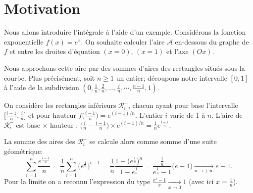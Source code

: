 \documentclass[class=report,crop=false]{standalone}
\begin{document}








\section*{Motivation}


Nous allons introduire l'intégrale à l'aide d'un exemple.
Considérons la fonction exponentielle $f(x)=e^x$. On souhaite calculer
l'aire $\mathcal{A}$ en-dessous du graphe de $f$ et entre les droites d'équation $(x=0)$, $(x=1)$ et l'axe $(O x)$.


Nous approchons cette aire par des sommes d'aires des rectangles situés sous la courbe.
Plus précisément, soit $n \ge 1$ un entier; découpons notre intervalle $[0,1]$
à l'aide de la subdivision $(0,\frac{1}{n},\frac{2}{n}, \ldots, \frac{i}{n}, \cdots,\frac{n-1}{n},1)$.

On considère les \og rectangles inférieurs \fg{} $\mathcal{R}_i^-$,
chacun ayant pour base l'intervalle $\big[\frac{i-1}{n},\frac{i}{n}\big]$
et pour hauteur $f\big(\frac{i-1}{n}\big)=e^{(i-1)/n}$. L'entier $i$ varie de $1$ à $n$.
L'aire de $\mathcal{R}_i^-$ est \og base $\times$ hauteur \fg{} : $\big(\frac{i}{n}-\frac{i-1}{n}\big) \times e^{(i-1)/n}
= \frac{1}{n} e^{\frac{i-1}{n}}$.


La somme des aires des $\mathcal{R}_i^-$ se calcule alors comme somme d'une suite géométrique:
\[
\sum_{i=1}^{n} \frac{e^{\frac{i-1}{n}}}{n}
= \frac{1}{n} \sum_{i=1}^{n} \big(e^{\frac 1n}\big)^{i-1}
= \frac{1}{n} \frac{1-\big(e^{\frac 1n}\big)^{n}}{1-e^{\frac 1n}}
= \frac{\frac{1}{n}}{e^{\frac 1n}-1}\big(e-1\big)
\xrightarrow[n\to+\infty]{} e-1.
\]
Pour la limite on a reconnu l'expression du type $\frac{e^x-1}{x} \xrightarrow[x\to 0]{} 1$
(avec ici $x=\frac1n$).
\end{document}
